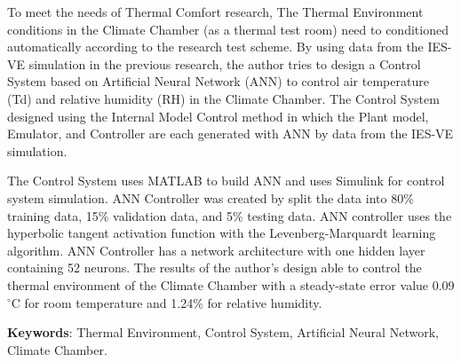 To meet the needs of Thermal Comfort research, The Thermal Environment conditions in the Climate Chamber (as a thermal test room) need to conditioned automatically according to the research test scheme. By using data from the IES-VE simulation in the previous research\cite{skripsiIchfan}, the author tries to design a Control System based on Artificial Neural Network (ANN) to control air temperature (Td) and relative humidity (RH) in the Climate Chamber. The Control System designed using the Internal Model Control method in which the Plant model, Emulator, and Controller are each generated with ANN by data from the IES-VE simulation.

The Control System uses MATLAB to build ANN and uses Simulink for control system simulation. ANN Controller was created by split the data into 80\% training data, 15\% validation data, and 5\% testing data. ANN controller uses the hyperbolic tangent activation function with the Levenberg-Marquardt learning algorithm. ANN Controller has a network architecture with one hidden layer containing 52 neurons. The results of the author's design able to control the thermal environment of the Climate Chamber with a steady-state error value 0.09$^\circ$C for room temperature and 1.24\% for relative humidity.

\vspace{0.5cm}
\hspace{-1.2cm}
\textbf{Keywords}: Thermal Environment, Control System, Artificial Neural Network, Climate Chamber.

